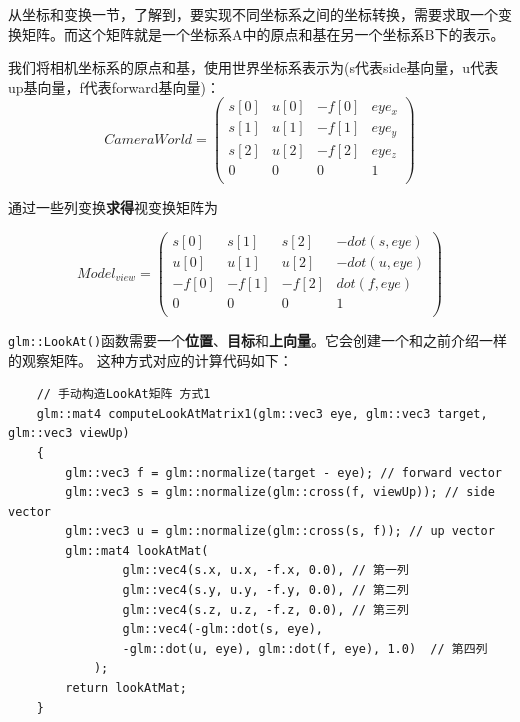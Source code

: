 \documentclass[UTF8,a4paper,12pt]{ctexbook}
\begin{document}
				从坐标和变换一节，了解到，要实现不同坐标系之间的坐标转换，需要求取一个变换矩阵。而这个矩阵就是一个坐标系A中的原点和基在另一个坐标系B下的表示。 
				
				我们将相机坐标系的原点和基，使用世界坐标系表示为(s代表side基向量，u代表up基向量，f代表forward基向量)： 
								$$
								CameraWorld =  
								\left(
								\begin{array}{cccc}
								s[0] & u[0] & -f[0]& eye_x\\
								
								s[1] & u[1] & -f[1]& eye_y\\
								
								s[2] & u[2] & -f[2]& eye_z\\
								
								0 & 0 & 0& 1\\
								\end{array}
								\right)
								$$
								
				通过一些列变换\textbf{求得}视变换矩阵为
				
					$$
					Model_{view} =  
					\left(
					\begin{array}{cccc}
						s[0] & s[1] & s[2]& -dot(s,eye)\\
						
						u[0] & u[1] & u[2]& -dot(u,eye)\\
						
						-f[0] & -f[1] & -f[2]& dot(f,eye)\\
						
						0 & 0 & 0& 1\\
					\end{array}
					\right)
					$$
			
				\verb|glm::LookAt()|函数需要一个\textbf{位置}、\textbf{目标}和\textbf{上向量}。它会创建一个和之前介绍一样的观察矩阵。	
				这种方式对应的计算代码如下：
				\begin{lstlisting}
	// 手动构造LookAt矩阵 方式1
	glm::mat4 computeLookAtMatrix1(glm::vec3 eye, glm::vec3 target, glm::vec3 viewUp)
	{
		glm::vec3 f = glm::normalize(target - eye); // forward vector 
		glm::vec3 s = glm::normalize(glm::cross(f, viewUp)); // side vector
		glm::vec3 u = glm::normalize(glm::cross(s, f)); // up vector
		glm::mat4 lookAtMat(
				glm::vec4(s.x, u.x, -f.x, 0.0), // 第一列
				glm::vec4(s.y, u.y, -f.y, 0.0), // 第二列
				glm::vec4(s.z, u.z, -f.z, 0.0), // 第三列
				glm::vec4(-glm::dot(s, eye),
				-glm::dot(u, eye), glm::dot(f, eye), 1.0)  // 第四列
			);
		return lookAtMat;
	}
				\end{lstlisting}
				
\end{document}
